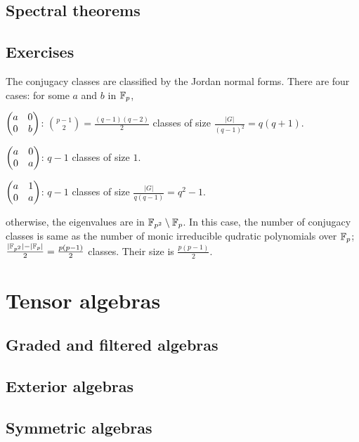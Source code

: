 \documentclass{../../large}
\begin{document}
\section{Spectral theorems}

\section*{Exercises}

\begin{prb}
The conjugacy classes are classified by the Jordan normal forms.
There are four cases: for some $a$ and $b$ in $\mathbb{F}_p$,
\begin{parts}
\item $\begin{pmatrix}a&0\\0&b\end{pmatrix}$: $\binom{p-1}2=\frac{(q-1)(q-2)}2$ classes of size $\frac{|G|}{(q-1)^2}=q(q+1)$.
\item $\begin{pmatrix}a&0\\0&a\end{pmatrix}$: $q-1$ classes of size $1$.
\item $\begin{pmatrix}a&1\\0&a\end{pmatrix}$: $q-1$ classes of size $\frac{|G|}{q(q-1)}=q^2-1$.
\item otherwise, the eigenvalues are in $\mathbb{F}_{p^2}\setminus\mathbb{F}_p$.
In this case, the number of conjugacy classes is same as the number of monic irreducible qudratic polynomials over $\mathbb{F}_p$; $\frac{|\mathbb{F}_{p^2}|-|\mathbb{F}_p|}2=\frac{p(p-1)}2$ classes.
Their size is $\frac{p(p-1)}2$.
\end{parts}
\end{prb}





\chapter{Tensor algebras}
\section{Graded and filtered algebras}
\section{Exterior algebras}
\begin{prb}[Determinants]
\end{prb}
\section{Symmetric algebras}
\end{document}
